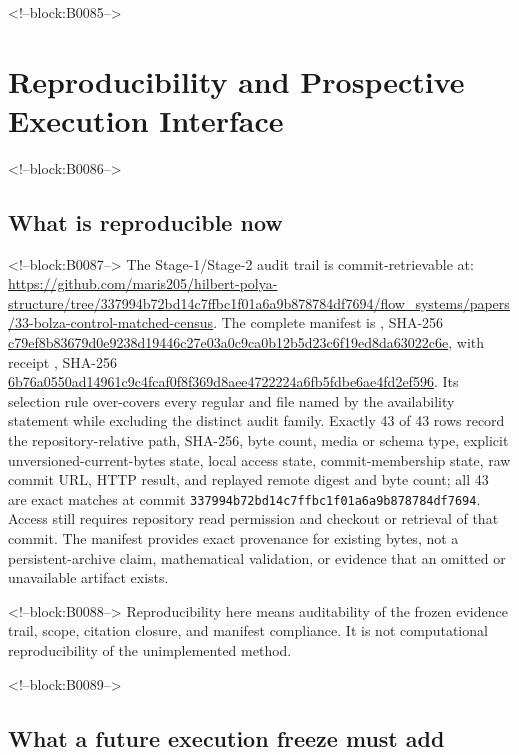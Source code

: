 \documentclass[11pt,a4paper]{article}
\begin{document}
<!--block:B0085-->
\hypertarget{reproducibility-and-prospective-execution-interface}{%
\section{Reproducibility and Prospective Execution Interface}\label{reproducibility-and-prospective-execution-interface}}

<!--block:B0086-->
\hypertarget{what-is-reproducible-now}{%
\subsection{What is reproducible now}\label{what-is-reproducible-now}}

<!--block:B0087-->
The Stage-1/Stage-2 audit trail is commit-retrievable at:\newline
\url{https://github.com/maris205/hilbert-polya-structure/tree/337994b72bd14c7ffbc1f01a6a9b878784df7694/flow_systems/papers/33-bolza-control-matched-census}.
The complete manifest is , SHA-256 \url{c79ef8b83679d0e9238d19446c27e03a0c9ca0b12b5d23c6f19ed8da63022c6e}, with receipt , SHA-256 \url{6b76a0550ad14961c9c4fcaf0f8f369d8aee4722224a6fb5fdbe6ae4fd2ef596}. Its selection rule over-covers every regular  and  file named by the availability statement while excluding the distinct  audit family. Exactly 43 of 43 rows record the repository-relative path, SHA-256, byte count, media or schema type, explicit unversioned-current-bytes state, local access state, commit-membership state, raw commit URL, HTTP result, and replayed remote digest and byte count; all 43 are exact matches at commit \texttt{337994b72bd14c7ffbc1f01a6a9b878784df7694}. Access still requires repository read permission and checkout or retrieval of that commit. The manifest provides exact provenance for existing bytes, not a persistent-archive claim, mathematical validation, or evidence that an omitted or unavailable artifact exists.

<!--block:B0088-->
Reproducibility here means auditability of the frozen evidence trail, scope, citation closure, and manifest compliance. It is not computational reproducibility of the unimplemented method.

<!--block:B0089-->
\hypertarget{what-a-future-execution-freeze-must-add}{%
\subsection{What a future execution freeze must add}\label{what-a-future-execution-freeze-must-add}}
\end{document}
